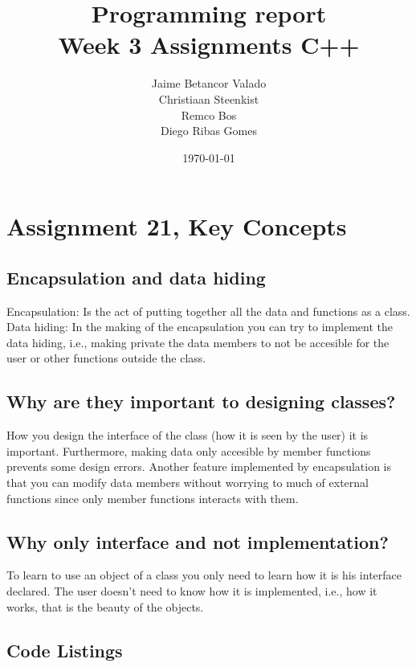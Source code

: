 \documentclass[11pt]{article}
\begin{document}
\title{Programming report \\
       Week 3 Assignments C++
}
\date{\today}
\author{Jaime Betancor Valado \\
Christiaan Steenkist \\
Remco Bos \\
Diego Ribas Gomes
}

\maketitle

\section*{Assignment 21, Key Concepts}

\subsection*{Encapsulation and data hiding}
Encapsulation: Is the act of putting together all the data and functions as a class.
Data hiding: In the making of the encapsulation you can try to implement the data hiding, i.e., making private the data members to not be accesible for the user or other functions outside the class.
\subsection*{Why are they important to designing classes?}
How you design the interface of the class (how it is seen by the user) it is important. Furthermore, making data only accesible by member functions prevents some design errors. Another feature implemented by encapsulation is that you can modify data members without worrying to much of external functions since only member functions interacts with them.
\subsection*{Why only interface and not implementation?}
To learn to use an object of a class you only need to learn how it is his interface declared. The user doesn't need to know how it is implemented, i.e., how it works, that is the beauty of the objects.

\subsection*{Code Listings}

\end{document}
